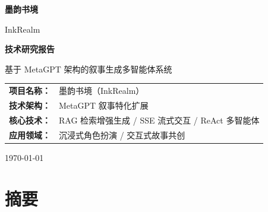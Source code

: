 \documentclass[UTF8,oneside,a4paper]{ctexart}
\begin{document}
\begin{titlepage}
\begin{center}
\vspace*{2cm}

{\fontsize{36}{40}\selectfont\bfseries\color{inkbrown} 墨韵书境}

\vspace{0.5cm}

{\fontsize{18}{22}\selectfont\color{inklight} InkRealm}

\vspace{1.5cm}

{\fontsize{24}{28}\selectfont\bfseries\color{inkbrown} 技术研究报告}

\vspace{0.3cm}

{\large\color{inklight} 基于 MetaGPT 架构的叙事生成多智能体系统}

\vspace{3cm}


\vspace{3cm}

{\large\color{inkbrown}
\begin{tabular}{rl}
\textbf{项目名称：} & 墨韵书境（InkRealm）\\[0.3em]
\textbf{技术架构：} & MetaGPT 叙事特化扩展\\[0.3em]
\textbf{核心技术：} & RAG 检索增强生成 / SSE 流式交互 / ReAct 多智能体\\[0.3em]
\textbf{应用领域：} & 沉浸式角色扮演 / 交互式故事共创\\[0.3em]
\end{tabular}
}

\vfill

{\large\color{inklight} \today}

\end{center}
\end{titlepage}

\newpage
\section*{摘要}
\end{document}
